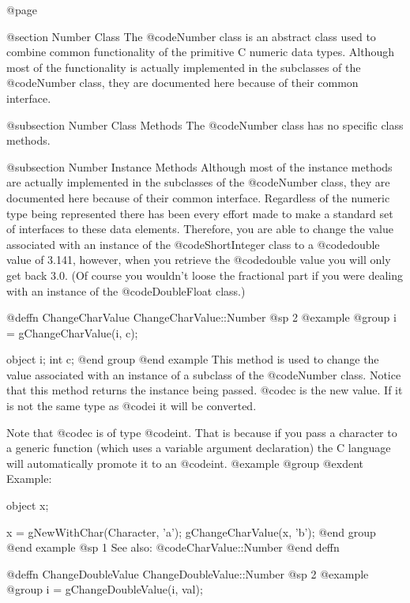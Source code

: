 @page

@section Number Class
The @code{Number} class is an abstract class used to combine common
functionality of the primitive C numeric data types.  Although most of the
functionality is actually implemented in the subclasses of the @code{Number}
class, they are documented here because of their common interface.


@subsection Number Class Methods
The @code{Number} class has no specific class methods.


@subsection Number Instance Methods
Although most of the instance methods are actually implemented in the
subclasses of the @code{Number} class, they are documented here because
of their common interface.  Regardless of the numeric type being
represented there has been every effort made to make a standard set of
interfaces to these data elements.  Therefore, you are able to change
the value associated with an instance of the @code{ShortInteger} class
to a @code{double} value of 3.141, however, when you retrieve the
@code{double} value you will only get back 3.0.  (Of course you
wouldn't loose the fractional part if you were dealing with an instance
of the @code{DoubleFloat} class.)





@deffn {ChangeCharValue} ChangeCharValue::Number
@sp 2
@example
@group
i = gChangeCharValue(i, c);

object  i;
int     c;
@end group
@end example
This method is used to change the value associated with an instance of
a subclass of the @code{Number} class.  Notice that this method
returns the instance being passed.  @code{c} is the new value.
If it is not the same type as @code{i} it will be converted.

Note that @code{c} is of type @code{int}.  That is because if you pass a
character to a generic function (which uses a variable argument
declaration) the C language will automatically promote it to an
@code{int}.
@example
@group
@exdent Example:

object  x;

x = gNewWithChar(Character, 'a');
gChangeCharValue(x, 'b');
@end group
@end example
@sp 1
See also:  @code{CharValue::Number}
@end deffn












@deffn {ChangeDoubleValue} ChangeDoubleValue::Number
@sp 2
@example
@group
i = gChangeDoubleValue(i, val);

